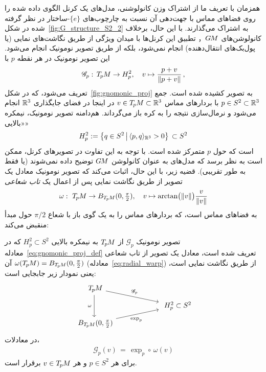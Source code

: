 همزمان با تعریف ما از اشتراک وزن کانولوشنی، مدل‌های \cite{coors2018spherenet,zhao2018distortion,tateno2018distortion,eder2019convolutions,martin2020panoramic} یک کرنل الگوی داده شده را روی فضاهای مماس با جهت‌دهی آن نسبت به چارچوب‌های $\{e\}$-ساختار در نظر گرفته شده در شکل~\ref{fig:G_structure_S2_2} به اشتراک می‌گذارند.
با این حال، برخلاف کانولوشن‌های $G\mkern-1.4muM$， تطبیق این کرنل‌ها با میدان ویژگی از طریق نگاشت‌های نمایی (یا پول‌بک‌های انتقال‌دهنده) انجام نمی‌شود، بلکه از طریق تصویر نومونیک انجام می‌شود.
این تصویر نومونیک در هر نقطه $p$ با
\begin{align}\label{eq:gnomonic_proj_def}
    \mathscr{G}_p:\, T_{\mkern-1.5mu p}\mkern-.5muM \to H_p^2, \quad v \mapsto \frac{p+v}{\lVert p+v\rVert} \,,
\end{align}
تعریف می‌شود، که در شکل~\ref{fig:gnomonic_proj} به تصویر کشیده شده است.
جمع $p\in S^2 \subset \mathbb{R}^3$ با بردارهای مماس $v \in T_{\mkern-1.5mu p}\mkern-.5muM \subset \mathbb{R}^3$ در اینجا در فضای جایگذاری $\mathbb{R}^3$ انجام می‌شود و نرمال‌سازی نتیجه را به کره باز می‌گرداند.
هم‌دامنه تصویر نومونیک، نیمکره «بالایی»
\begin{align}\label{eq:upper_hemisphere_def}
    H_p^2 := \big\{ q\in S^2 \,\big|\, \langle p,q\rangle_{\mathbb{R}^3} > 0 \big\} \,\subset S^2
\end{align}
است که حول $p$ متمرکز شده است.
با توجه به این تفاوت در تصویرهای کرنل، ممکن است به نظر برسد که مدل‌های \cite{coors2018spherenet,zhao2018distortion,tateno2018distortion,eder2019convolutions,martin2020panoramic} به عنوان کانولوشن $G\mkern-1.4muM$ توضیح داده نمی‌شوند (یا فقط به طور تقریبی).
قضیه زیر، با این حال، اثبات می‌کند که تصویر نومونیک معادل یک تصویر از طریق نگاشت نمایی پس از اعمال یک \emph{تاب شعاعی}
\begin{align}\label{eq:radial_warp}
    \omega:\ T_{\mkern-1.5mu p}\mkern-.5muM \to B_{T_{\mkern-1.5mu p}\mkern-.5muM}(0,{\textstyle\frac{\pi}{2}}), \quad
    v \mapsto \arctan\! \big(\lVert v\rVert\big) \frac{v}{\lVert v\rVert}
\end{align}
به فضاهای مماس است، که بردارهای مماس را به یک گوی باز با شعاع $\pi/2$ حول مبدأ منقبض می‌کند:
\begin{thm}
\label{thm:gnomonic}
    تصویر نومونیک $\mathscr{G}_p$ از $T_{\mkern-1.5mu p}\mkern-.5muM$ به نیمکره بالایی $H_p^2\subset S^2$ که در معادله~\eqref{eq:gnomonic_proj_def} تعریف شده است، معادل یک تصویر از تاب شعاعی آن $\omega(T_{\mkern-1.5mu p}\mkern-.5muM) = B_{T_{\mkern-1.5mu p}\mkern-.5muM}(0,{\textstyle\frac{\pi}{2}})$ (معادله~\eqref{eq:radial_warp}) از طریق نگاشت نمایی است، یعنی نمودار زیر جابجایی است:
    \begin{equation}\label{cd:gnomonic_exp_warp}
    \begin{tikzcd}[column sep=60, row sep=6pt, font=\normalsize]
        \TpM
            \arrow[dr, pos=.45, "\mathscr{G}_p"]
            \arrow[dd, "\omega\,"']
        \\
        & H_p^2 \subset S^2
        \\
        B_{\TpM}(0,{\textstyle\frac{\pi}{2}})
            \arrow[ur, pos=.3, "\exp_p"']
    \end{tikzcd}
    \end{equation}
    در معادلات،
    \begin{align}
        \mathscr{G}_p(v) \,=\, \exp_p \circ\, \omega(v)
    \end{align}
    برای هر $p\in S^2$ و هر $v\in T_{\mkern-1.5mu p}\mkern-.5muM$ برقرار است.
\end{thm}
